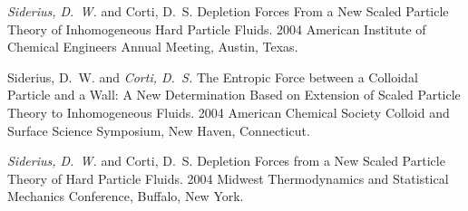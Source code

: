 {\it Siderius, D.~W.} and Corti, D.~S. Depletion Forces From a New Scaled Particle Theory of Inhomogeneous Hard Particle Fluids. 2004 American Institute of Chemical Engineers Annual Meeting, Austin, Texas.

Siderius, D.~W. and {\it Corti, D.~S.} The Entropic Force between a Colloidal Particle and a Wall: A New Determination Based on Extension of Scaled Particle Theory to Inhomogeneous Fluids. 2004 American Chemical Society Colloid and Surface Science Symposium, New Haven, Connecticut.

{\it Siderius, D.~W.} and Corti, D.~S. Depletion Forces from a New Scaled Particle Theory of Hard Particle Fluids. 2004 Midwest Thermodynamics and Statistical Mechanics Conference, Buffalo, New York.
